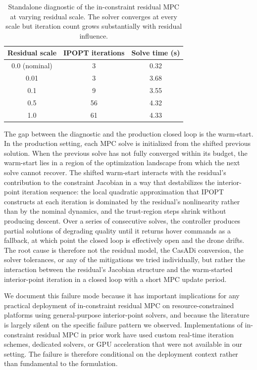 \documentclass[conference]{IEEEtran}
\begin{document}
\begin{table}[t]
\centering
\caption{Standalone diagnostic of the in-constraint residual MPC at varying residual scale. The solver converges at every scale but iteration count grows substantially with residual influence.}
\label{tab:diagnostic}
\begin{tabular}{ccc}
\toprule
Residual scale & IPOPT iterations & Solve time (s) \\
\midrule
0.0 (nominal) & 3 & 0.32 \\
0.01 & 3 & 3.68 \\
0.1 & 9 & 3.55 \\
0.5 & 56 & 4.32 \\
1.0 & 61 & 4.33 \\
\bottomrule
\end{tabular}
\end{table}

The gap between the diagnostic and the production closed loop is the warm-start. In the production setting, each MPC solve is initialized from the shifted previous solution. When the previous solve has not fully converged within its budget, the warm-start lies in a region of the optimization landscape from which the next solve cannot recover. The shifted warm-start interacts with the residual's contribution to the constraint Jacobian in a way that destabilizes the interior-point iteration sequence: the local quadratic approximation that IPOPT constructs at each iteration is dominated by the residual's nonlinearity rather than by the nominal dynamics, and the trust-region steps shrink without producing descent. Over a series of consecutive solves, the controller produces partial solutions of degrading quality until it returns hover commands as a fallback, at which point the closed loop is effectively open and the drone drifts. The root cause is therefore not the residual model, the CasADi conversion, the solver tolerances, or any of the mitigations we tried individually, but rather the interaction between the residual's Jacobian structure and the warm-started interior-point iteration in a closed loop with a short MPC update period.

We document this failure mode because it has important implications for any practical deployment of in-constraint residual MPC on resource-constrained platforms using general-purpose interior-point solvers, and because the literature is largely silent on the specific failure pattern we observed. Implementations of in-constraint residual MPC in prior work \cite{torrente2021data, salzmann2023real} have used custom real-time iteration schemes, dedicated solvers, or GPU acceleration that were not available in our setting. The failure is therefore conditional on the deployment context rather than fundamental to the formulation.
\end{document}
